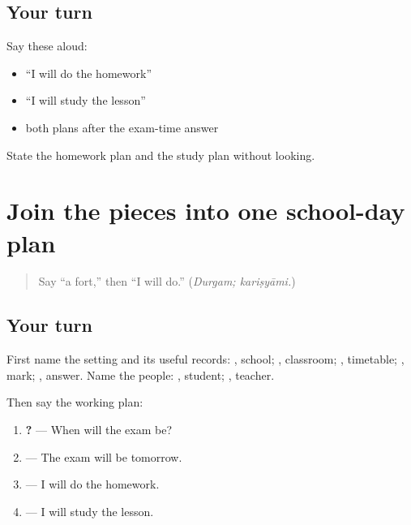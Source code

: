 \subsection*{Your turn}
Say these aloud:

\begin{itemize}
\raggedright
  \item “I will do the homework”
  \item “I will study the lesson”
  \item both plans after the exam-time answer
\end{itemize}

\begin{tcolorbox}[breakable,colback=teal!4,colframe=teal!35!black,title={Before you move on}]
State the homework plan and the study plan without looking.
\end{tcolorbox}
\section[(complete one school-day plan)]{Join the pieces into one school-day plan}

\label{lesson:SA-C267-complete-school-plan}



\begin{quote}
Say “a fort,” then “I will do.” (\emph{Durgam; kariṣyāmi.})
\end{quote}

\subsection*{Your turn}
First name the setting and its useful records: \textbf{}, school; \textbf{}, classroom; \textbf{}, timetable; \textbf{}, mark; \textbf{}, answer. Name the people: \textbf{}, student; \textbf{}, teacher.

Then say the working plan:

\begin{enumerate}
\raggedright
  \item \textbf{  ?} — When will the exam be?
  \item \textbf{  } — The exam will be tomorrow.
  \item \textbf{ } — I will do the homework.
  \item \textbf{ } — I will study the lesson.
\end{enumerate}

